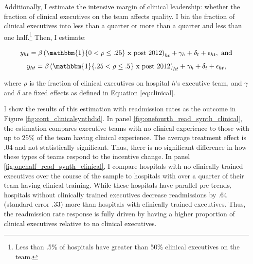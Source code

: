 \documentclass[12pt]{article}
\begin{document}
\begin{figure}[ht!]
\begin{subfigure}[b]{0.45\textwidth}
         \label{fig:mort_synth_clinical}
     \end{subfigure}
        \label{fig:clinicalsynthdid}
    \end{figure}

    Additionally, I estimate the intensive margin of clinical leadership: whether the fraction of clinical executives on the team affects quality. I bin the fraction of clinical executives into less than a quarter or more than a quarter and less than one half.\footnote{Less than .5\% of hospitals have greater than 50\% clinical executives on the team.} Then, I estimate:

    \begin{equation}
    \label{eq:clinical_continuous_onefourth}
    y_{ht} = \beta \left(\mathbbm{1}\{0 < \rho \leq .25\}\text{ x post 2012}\right)_{ht} + \gamma_{h} + \delta_t + \epsilon_{ht}, \text{ and}
    \end{equation}
    \begin{equation}
    \label{eq:clinical_continuous_onehalf}
    y_{ht} = \beta \left(\mathbbm{1}\{.25 < \rho \leq .5\}\text{ x post 2012}\right)_{ht} + \gamma_{h} + \delta_t + \epsilon_{ht},
    \end{equation}

    \noindent where $\rho$ is the fraction of clinical executives on hospital $h$'s executive team, and $\gamma$ and $\delta$ are fixed effects as defined in Equation \ref{eq:clinical}. 

    I show the results of this estimation with readmission rates as the outcome in Figure \ref{fig:cont_clinicalsynthdid}. In panel \ref{fig:onefourth_read_synth_clinical}, the estimation compares executive teams with no clinical experience to those with up to 25\% of the team having clinical experience. The average treatment effect is .04 and not statistically significant. Thus, there is no significant difference in how these types of teams respond to the incentive change. In panel \ref{fig:onehalf_read_synth_clinical}, I compare hospitals with no clinically trained executives over the course of the sample to hospitals with over a quarter of their team having clinical training. While these hospitals have parallel pre-trends, hospitals without clinically trained executives decrease readmissions by .64 (standard error .33) more than hospitals with clinically trained executives. Thus, the readmission rate response is fully driven by having a higher proportion of clinical executives relative to no clinical executives.
\end{document}
